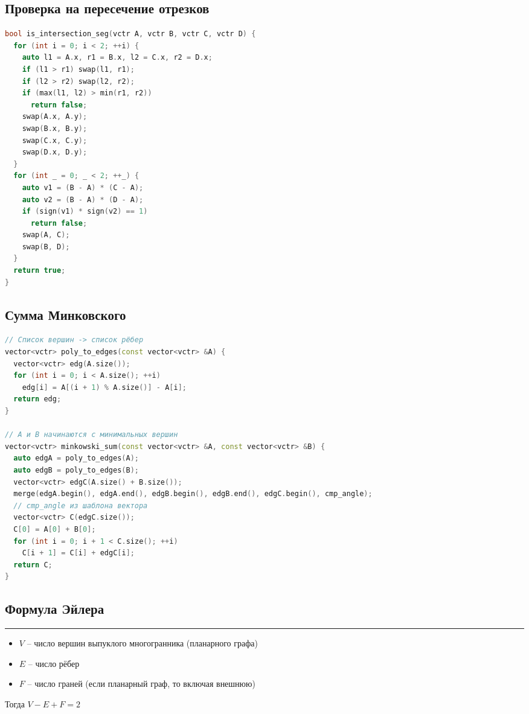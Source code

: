 \documentclass[9pt,a4paper,landscape,twosided]{extarticle}
\begin{document}
\begin{multicols*}{3}
\begin{lstlisting}[language=C++]
\end{lstlisting}

\subsection{Проверка на пересечение отрезков}
\begin{lstlisting}[language=C++]
bool is_intersection_seg(vctr A, vctr B, vctr C, vctr D) {
  for (int i = 0; i < 2; ++i) {
    auto l1 = A.x, r1 = B.x, l2 = C.x, r2 = D.x;
    if (l1 > r1) swap(l1, r1);
    if (l2 > r2) swap(l2, r2);
    if (max(l1, l2) > min(r1, r2))
      return false;
    swap(A.x, A.y);
    swap(B.x, B.y);
    swap(C.x, C.y);
    swap(D.x, D.y);
  }
  for (int _ = 0; _ < 2; ++_) {
    auto v1 = (B - A) * (C - A);
    auto v2 = (B - A) * (D - A);
    if (sign(v1) * sign(v2) == 1)
      return false;
    swap(A, C);
    swap(B, D);
  }
  return true;
}

\end{lstlisting}

\subsection{Сумма Минковского}
\begin{lstlisting}[language=C++]
// Список вершин -> список рёбер
vector<vctr> poly_to_edges(const vector<vctr> &A) {
  vector<vctr> edg(A.size());
  for (int i = 0; i < A.size(); ++i)
    edg[i] = A[(i + 1) % A.size()] - A[i];
  return edg;
}

// A и B начинаются с минимальных вершин
vector<vctr> minkowski_sum(const vector<vctr> &A, const vector<vctr> &B) {
  auto edgA = poly_to_edges(A);
  auto edgB = poly_to_edges(B);
  vector<vctr> edgC(A.size() + B.size());
  merge(edgA.begin(), edgA.end(), edgB.begin(), edgB.end(), edgC.begin(), cmp_angle);
  // cmp_angle из шаблона вектора
  vector<vctr> C(edgC.size());
  C[0] = A[0] + B[0];
  for (int i = 0; i + 1 < C.size(); ++i)
    C[i + 1] = C[i] + edgC[i];
  return C;
}

\end{lstlisting}

\subsection{Формула Эйлера}
\noindent\rule{\linewidth}{0.15mm}
\begin{itemize}
    \item $V$ -- число вершин выпуклого многогранника (планарного графа)
    \item $E$ -- число рёбер
    \item $F$ -- число граней (если планарный граф, то включая внешнюю)
\end{itemize}
Тогда $V-E+F=2$


\end{multicols*}
\end{document}

